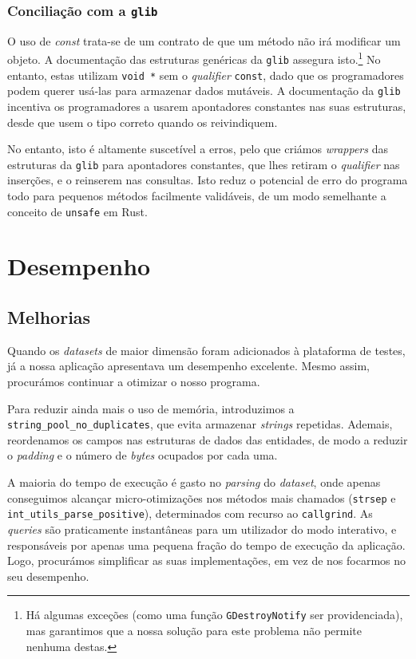 \documentclass[11pt, a4paper]{article}
\begin{document}
\subsubsection{Conciliação com a \texttt{glib}}
\label{sec:glib-conciliation}

O uso de \emph{const} trata-se de um contrato de que um método não irá modificar um objeto. A
documentação das estruturas genéricas da \texttt{glib} assegura isto.\footnote{Há algumas exceções
(como uma função \texttt{GDestroyNotify} ser providenciada), mas garantimos que a nossa solução para
este problema não permite nenhuma destas.} No entanto, estas utilizam \texttt{void *} sem o
\emph{qualifier} \texttt{const}, dado que os programadores podem querer usá-las para armazenar dados
mutáveis. A documentação da \texttt{glib} incentiva os programadores a usarem apontadores constantes
nas suas estruturas, desde que usem o tipo correto quando os reivindiquem.

No entanto, isto é altamente suscetível a erros, pelo que criámos \emph{wrappers} das estruturas da
\texttt{glib} para apontadores constantes, que lhes retiram o \emph{qualifier} nas inserções, e o
reinserem nas consultas. Isto reduz o potencial de erro do programa todo para pequenos métodos
facilmente validáveis, de um modo semelhante a conceito de \texttt{unsafe} em Rust.

\section{Desempenho}
\label{sec:performance}

\subsection{Melhorias}
\label{sec:performance-improvements}

Quando os \emph{datasets} de maior dimensão foram adicionados à plataforma de testes, já a nossa
aplicação apresentava um desempenho excelente. Mesmo assim, procurámos continuar a otimizar o nosso
programa.

Para reduzir ainda mais o uso de memória, introduzimos a \texttt{string\_pool\_no\_duplicates}, que
evita armazenar \emph{strings} repetidas. Ademais, reordenamos os campos nas estruturas de dados das
entidades, de modo a reduzir o \emph{padding} e o número de \emph{bytes} ocupados por cada uma.

A maioria do tempo de execução é gasto no \emph{parsing} do \emph{dataset}, onde apenas conseguimos
alcançar micro-otimizações nos métodos mais chamados (\texttt{strsep} e
\texttt{int\_utils\_parse\_positive}), determinados com recurso ao \texttt{callgrind}. As
\emph{queries} são praticamente instantâneas para um utilizador do modo interativo, e responsáveis
por apenas uma pequena fração do tempo de execução da aplicação. Logo, procurámos simplificar
as suas implementações, em vez de nos focarmos no seu desempenho.
\end{document}
